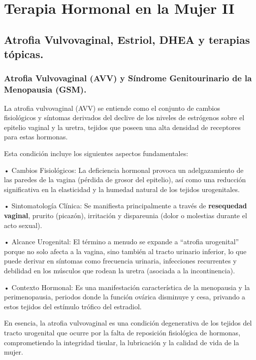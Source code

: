 \documentclass[
  spanish,
]{article}
\begin{document}
\section{Terapia Hormonal en la Mujer II}\label{terapia-hormonal-2}

\subsection{Atrofia Vulvovaginal, Estriol, DHEA y terapias tópicas.}\label{atrofia-vulvovaginal-estriol-dhea-y-terapias-tuxf3picas.}

\subsubsection{Atrofia Vulvovaginal (AVV) y Síndrome Genitourinario de la Menopausia (GSM).}\label{atrofia-vulvovaginal-avv-y-suxedndrome-genitourinario-de-la-menopausia-gsm.}

La atrofia vulvovaginal (AVV) se entiende como el conjunto de cambios fisiológicos y síntomas derivados del declive de los niveles de estrógenos sobre el epitelio vaginal y la uretra, tejidos que poseen una alta densidad de receptores para estas hormonas.

Esta condición incluye los siguientes aspectos fundamentales:

• Cambios Fisiológicos: La deficiencia hormonal provoca un adelgazamiento de las paredes de la vagina (pérdida de grosor del epitelio), así como una reducción significativa en la elasticidad y la humedad natural de los tejidos urogenitales.

• Sintomatología Clínica: Se manifiesta principalmente a través de \textbf{resequedad vaginal}, prurito (picazón), irritación y dispareunia (dolor o molestias durante el acto sexual).

• Alcance Urogenital: El término a menudo se expande a ``atrofia urogenital'' porque no solo afecta a la vagina, sino también al tracto urinario inferior, lo que puede derivar en síntomas como frecuencia urinaria, infecciones recurrentes y debilidad en los músculos que rodean la uretra (asociada a la incontinencia).

• Contexto Hormonal: Es una manifestación característica de la menopausia y la perimenopausia, periodos donde la función ovárica disminuye y cesa, privando a estos tejidos del estímulo trófico del estradiol.

En esencia, la atrofia vulvovaginal es una condición degenerativa de los tejidos del tracto urogenital que ocurre por la falta de reposición fisiológica de hormonas, comprometiendo la integridad tisular, la lubricación y la calidad de vida de la mujer.
\end{document}

